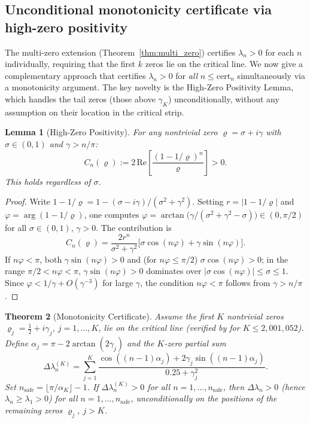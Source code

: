 \documentclass[11pt]{article}
\newtheorem{theorem}{Theorem}
\newtheorem{lemma}[theorem]{Lemma}
\begin{document}
\subsection{Unconditional monotonicity certificate via high-zero positivity}
\label{sec:high_zero_cert}

The multi-zero extension (Theorem~\ref{thm:multi_zero}) certifies $\lambda_n > 0$ for each $n$
individually, requiring that the first $k$ zeros lie on the critical line.  We now give a
complementary approach that certifies $\lambda_n > 0$ for \emph{all} $n \le \mathrm{cert}_n$
simultaneously via a monotonicity argument.  The key novelty is the High-Zero Positivity Lemma,
which handles the tail zeros (those above $\gamma_K$) unconditionally, without any assumption
on their location in the critical strip.

\begin{lemma}[High-Zero Positivity]
\label{lem:high_zero}
For any nontrivial zero $\varrho = \sigma + i\gamma$ with $\sigma \in (0,1)$ and $\gamma > n/\pi$:
\[
  C_n(\varrho) := 2\,\mathrm{Re}\!\left[\frac{(1 - 1/\varrho)^n}{\varrho}\right] > 0.
\]
This holds regardless of $\sigma$.
\end{lemma}

\begin{proof}
Write $1 - 1/\varrho = 1 - (\sigma - i\gamma)/(\sigma^2+\gamma^2)$.  Setting $r = |1-1/\varrho|$
and $\varphi = \arg(1-1/\varrho)$, one computes
$\varphi = \arctan\!\bigl(\gamma/(\sigma^2+\gamma^2-\sigma)\bigr) \in (0,\pi/2)$
for all $\sigma \in (0,1)$, $\gamma > 0$.  The contribution is
\[
  C_n(\varrho) = \frac{2r^n}{\sigma^2+\gamma^2}\bigl[\sigma\cos(n\varphi) + \gamma\sin(n\varphi)\bigr].
\]
If $n\varphi < \pi$, both $\gamma\sin(n\varphi) > 0$ and (for $n\varphi \le \pi/2$)
$\sigma\cos(n\varphi) > 0$; in the range $\pi/2 < n\varphi < \pi$,
$\gamma\sin(n\varphi) > 0$ dominates over $|\sigma\cos(n\varphi)| \le \sigma \le 1$.
Since $\varphi < 1/\gamma + O(\gamma^{-3})$ for large $\gamma$, the condition $n\varphi < \pi$
follows from $\gamma > n/\pi$.
\end{proof}

\begin{theorem}[Monotonicity Certificate]
\label{thm:mono_cert}
Assume the first $K$ nontrivial zeros $\varrho_j = \tfrac{1}{2} + i\gamma_j$, $j = 1,\ldots,K$,
lie on the critical line (verified by \cite{platt2021} for $K \le 2{,}001{,}052$).
Define $\alpha_j = \pi - 2\arctan(2\gamma_j)$ and the $K$-zero partial sum
\[
  \Delta\lambda_n^{(K)} = \sum_{j=1}^K \frac{\cos((n{-}1)\alpha_j) + 2\gamma_j\sin((n{-}1)\alpha_j)}{0.25 + \gamma_j^2}.
\]
Set $n_{\mathrm{safe}} = \lfloor\pi/\alpha_K\rfloor - 1$.
If $\Delta\lambda_n^{(K)} > 0$ for all $n = 1,\ldots,n_{\mathrm{safe}}$, then
$\Delta\lambda_n > 0$ (hence $\lambda_n \ge \lambda_1 > 0$) for all $n = 1,\ldots,n_{\mathrm{safe}}$,
unconditionally on the positions of the remaining zeros $\varrho_j$, $j > K$.
\end{theorem}
\end{document}
